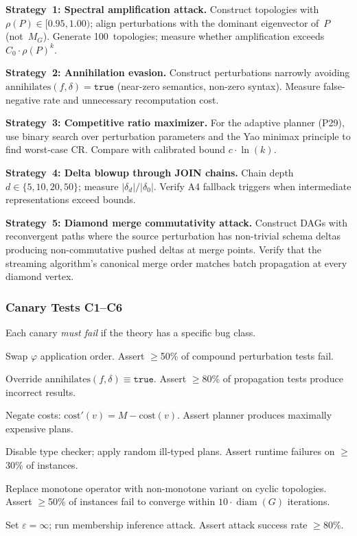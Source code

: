 \documentclass[11pt,a4paper]{article}
\theoremstyle{definition}
\newcommand{\ann}{\mathrm{annihilates}}
\newcommand{\cost}{\mathrm{cost}}
\DeclareMathOperator{\diam}{diam}
\begin{document}
\textbf{Strategy~1: Spectral amplification attack.}
Construct topologies with $\rho(P) \in [0.95, 1.00)$; align
perturbations with the dominant eigenvector of~$P$ (not~$M_G$).
Generate 100~topologies; measure whether amplification exceeds
$C_0 \cdot \rho(P)^k$.

\textbf{Strategy~2: Annihilation evasion.}
Construct perturbations narrowly avoiding $\ann(f, \delta) = \mathtt{true}$
(near-zero semantics, non-zero syntax).  Measure false-negative rate and
unnecessary recomputation cost.

\textbf{Strategy~3: Competitive ratio maximizer.}
For the adaptive planner (P29), use binary search over perturbation
parameters and the Yao minimax principle to find worst-case $\mathrm{CR}$.
Compare with calibrated bound $c \cdot \ln(k)$.

\textbf{Strategy~4: Delta blowup through JOIN chains.}
Chain depth $d \in \{5, 10, 20, 50\}$; measure $|\delta_d|/|\delta_0|$.
Verify A4 fallback triggers when intermediate representations exceed bounds.

\textbf{Strategy~5: Diamond merge commutativity attack.}
Construct DAGs with reconvergent paths where the source perturbation has
non-trivial schema deltas producing non-commutative pushed deltas at
merge points.  Verify that the streaming algorithm's canonical merge order
matches batch propagation at every diamond vertex.

\subsubsection{Canary Tests C1--C6}
\label{sec:canary}

Each canary \emph{must fail} if the theory has a specific bug class.

\begin{description}[nosep,leftmargin=*]
  \item[C1: Commutativity violation.]
    Swap $\varphi$ application order.  Assert $\geq$50\% of compound
    perturbation tests fail.

  \item[C2: Annihilation soundness.]
    Override $\ann(f,\delta) \equiv \mathtt{true}$.  Assert $\geq$80\%
    of propagation tests produce incorrect results.

  \item[C3: Cost model inversion.]
    Negate costs: $\cost'(v) = M - \cost(v)$.  Assert planner produces
    maximally expensive plans.

  \item[C4: Type system bypass.]
    Disable type checker; apply random ill-typed plans.  Assert runtime
    failures on $\geq$30\% of instances.

  \item[C5: Fixed-point non-convergence.]
    Replace monotone operator with non-monotone variant on cyclic topologies.
    Assert $\geq$50\% of instances fail to converge within
    $10 \cdot \diam(G)$ iterations.

  \item[C6: Privacy mechanism disabled.]
    Set $\varepsilon = \infty$; run membership inference attack.  Assert
    attack success rate $\geq$80\%.
\end{description}
\end{document}
